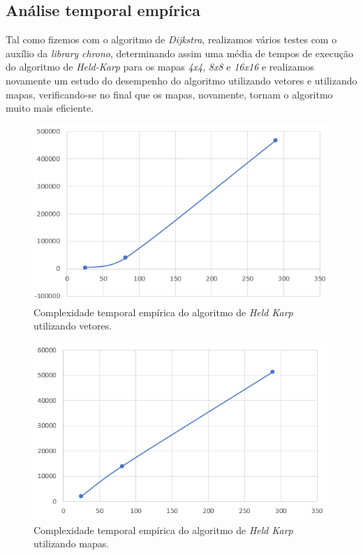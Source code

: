 \documentclass[article, a4paper, 12pt, oneside]{memoir}
\begin{document}
\subsection{Análise temporal empírica }

Tal como fizemos com o algoritmo de \textit{Dijkstra}, realizamos vários testes com o auxílio da \textit{library} \textit{chrono}, determinando assim uma média de tempos de execução do algoritmo de \textit{Held-Karp} para os mapas \textit{4x4}, \textit{8x8} e \textit{16x16} e realizamos novamente um estudo do desempenho do algoritmo utilizando vetores e utilizando mapas, verificando-se no final que os mapas, novamente, tornam o algoritmo muito mais eficiente.
		
		
\begin{figure}[h!]
  \centerline{\includegraphics[scale=0.6]{held_karp.png}}
  \caption{Complexidade temporal empírica do algoritmo de \textit{Held Karp} utilizando vetores.}
\end{figure}

\begin{figure}[h!]
  \centerline{\includegraphics[scale=0.6]{held_karp_mapas.png}}
  \caption{Complexidade temporal empírica do algoritmo de \textit{Held Karp} utilizando mapas.}
\end{figure}
		
\end{document}
